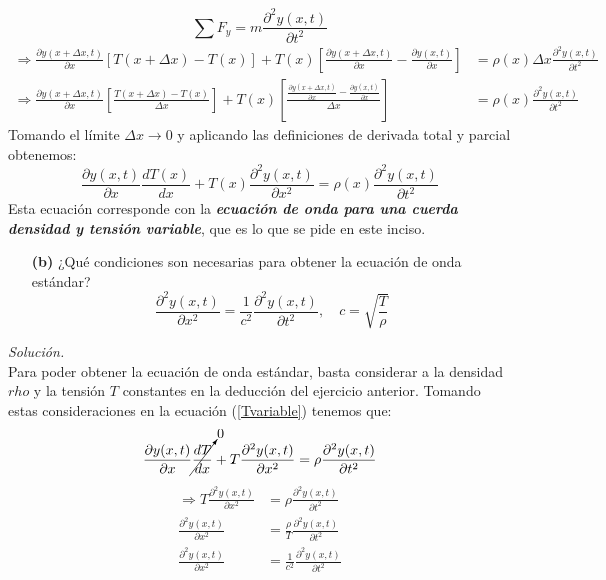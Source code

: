 \documentclass[11pt]{article}
\begin{document}
	$$\sum F_y = m\frac{\partial^2 y(x, t)}{\partial t^2}$$
	\begin{align*}
		\Rightarrow \frac{\partial y(x+\Delta x, t)}{\partial x}\left[ T(x +\Delta x) - T(x)\right]+ T(x)\left[\frac{\partial y(x+\Delta x, t)}{\partial x}- \frac{\partial y(x, t)}{\partial x}\right] &= \rho(x) \Delta x \frac{\partial^2 y(x,t)}{\partial t^2}	\\
		\Rightarrow \frac{\partial y(x+\Delta x, t)}{\partial x}\left[ \frac{T(x +\Delta x) - T(x)}{\Delta x}\right]+ T(x)\left[\frac{\frac{\partial y(x+\Delta x, t)}{\partial x}- \frac{\partial y(x, t)}{\partial x}}{\Delta x}\right]&=  \rho(x)\frac{\partial^2 y(x,t)}{\partial t^2}
	\end{align*}
	Tomando el límite  $\Delta x \to 0$ y aplicando las definiciones de derivada total y parcial obtenemos:
	\begin{equation}
		\frac{\partial y(x,t)}{\partial x} \frac{dT(x)}{dx} + T(x)\frac{\partial^2 y(x,t)}{\partial x^2} = \rho (x) \frac{\partial^2 y(x,t)}{\partial t^2}	\label{Tvariable}
	\end{equation}
	Esta ecuación corresponde con  la \textit{\textbf{ecuación de onda para una cuerda densidad y tensión variable}}, que es lo que se pide en este inciso.

\begin{enumerate}
	\item [\textbf{(b)}] ¿Qué condiciones son necesarias para obtener la ecuación de onda estándar?
	\begin{equation}
	 \frac{\partial^2 y(x,t)}{\partial x^2} = \frac{1}{c^2} \frac{\partial^2 y(x,t)}{\partial t^2},\quad c=\sqrt{ \frac{T}{\rho}}
	\end{equation}
\end{enumerate}
\textit{Solución.}\\
	Para poder obtener la ecuación de onda estándar, basta considerar a la densidad $rho$ y la tensión $T$ constantes en la deducción del ejercicio anterior. Tomando estas consideraciones en la ecuación (\ref{Tvariable}) tenemos que:
	$$\frac{\partial y(x,t)}{\partial x} \cancelto{0}{ \frac{dT}{dx} } + T\frac{\partial^2 y(x,t)}{\partial x^2} = \rho \frac{\partial^2 y(x,t)}{\partial t^2}$$
	\begin{align*}
		 \Rightarrow T\frac{\partial^2 y(x,t)}{\partial x^2} &= \rho \frac{\partial^2 y(x,t)}{\partial t^2}	\\
		 \frac{\partial^2 y(x,t)}{\partial x^2} &= \frac{\rho}{T} \frac{\partial^2 y(x,t)}{\partial t^2}	\\
		 \frac{\partial^2 y(x,t)}{\partial x^2} &= \frac{1}{c^2} \frac{\partial^2 y(x,t)}{\partial t^2}
	\end{align*}
\end{document}
